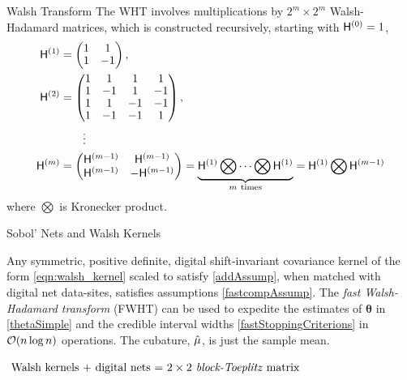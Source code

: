 \documentclass[handout, 10pt,compress,xcolor={usenames,dvipsnames}]{beamer} %
\newcommand{\bm}[1]{\boldsymbol{#1}}
\renewcommand{\vtheta}{{\bm{\theta}}}
\newcommand{\redroundmathbox}[1]{\parbox{\widthof{$#1$\hspace{1em}}}
	{\begin{mdframed}[style=redshade]\centering $#1$ \end{mdframed}}}
\begin{document}
\begin{frame}{Walsh Transform}
	The WHT involves multiplications by $2^m \times 2^m$ Walsh-Hadamard matrices, which is constructed recursively, starting with $\mathsf{H}^{(0)} = 1$,
	\begin{align}
	\nonumber
	\arraycolsep=1.4pt\def\arraystretch{0.9}
	\mH^{(1)} &=
	\begin{pmatrix}
	1 & 1 \\ 1 & -1
	\end{pmatrix}, \\
	\nonumber
	\mH^{(2)} &= 
	\begin{pmatrix}
	1 & 1 & 1 & 1 \\ 
	1 & -1 & 1 & -1 \\
	1 & 1 & -1 & -1 \\ 
	1 & -1 & -1 & 1 \\
	\end{pmatrix}, \\
	\nonumber
	& \qquad \vdots
	\\
	\label{eqn:hadamard_matrix}
	\mH^{(m)} &= 
	\begin{pmatrix}
	\mH^{(m-1)} & \mH^{(m-1)} \\ \mH^{(m-1)} & -\mH^{(m-1)}
	\end{pmatrix} 
	= \underbrace{\mH^{(1)} \bigotimes \cdots \bigotimes \mH^{(1)}}_{m \ \text{times}} 
	= \mH^{(1)} \bigotimes \mH^{(m-1)}
	\end{align}
	where $\bigotimes$ is Kronecker product.
\end{frame}



\begin{frame}{Sobol' Nets and Walsh Kernels}
	
	\begin{theorem}
		Any symmetric, positive definite, digital shift-invariant covariance kernel of the form \eqref{eqn:walsh_kernel} scaled to satisfy \eqref{addAssump}, when matched with digital net data-sites, satisfies assumptions \eqref{fastcompAssump}.  The \emph{fast Walsh-Hadamard transform} (FWHT) can be used to expedite the estimates of $\vtheta$ in \eqref{thetaSimple} and the credible interval widths \eqref{fastStoppingCriterions} in $\operatorname{{\mathcal O}}(n \log n)$ operations. The cubature, $\hat{\mu}$, is just the sample mean.
	\end{theorem}
	
	\centering\redroundmathbox{\text{
			Walsh kernels + digital nets = \emph{$2\times 2$ block-Toeplitz} matrix
	}}

\end{frame}
\end{document}
